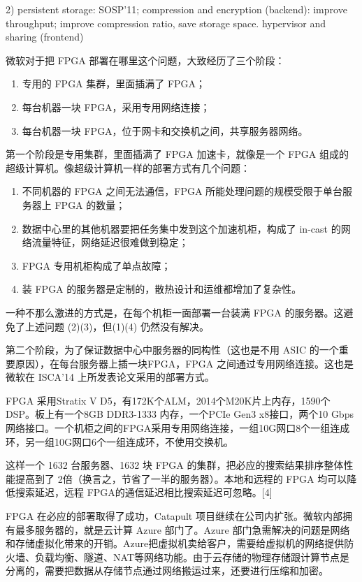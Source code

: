 2) persistent storage: SOSP'11; compression and encryption (backend): improve throughput; improve compression ratio, save storage space.
hypervisor and sharing (frontend)



微软对于把 FPGA 部署在哪里这个问题，大致经历了三个阶段：
\begin{enumerate}
	\item 专用的 FPGA 集群，里面插满了 FPGA；
	\item 每台机器一块 FPGA，采用专用网络连接；
	\item 每台机器一块 FPGA，位于网卡和交换机之间，共享服务器网络。
\end{enumerate}

第一个阶段是专用集群，里面插满了 FPGA 加速卡，就像是一个 FPGA 组成的超级计算机。像超级计算机一样的部署方式有几个问题：

\begin{enumerate}
	\item 不同机器的 FPGA 之间无法通信，FPGA 所能处理问题的规模受限于单台服务器上 FPGA 的数量；
	\item 数据中心里的其他机器要把任务集中发到这个加速机柜，构成了 in-cast 的网络流量特征，网络延迟很难做到稳定；
	\item FPGA 专用机柜构成了单点故障；
	\item 装 FPGA 的服务器是定制的，散热设计和运维都增加了复杂性。
\end{enumerate}

一种不那么激进的方式是，在每个机柜一面部署一台装满 FPGA 的服务器。这避免了上述问题 (2)(3)，但(1)(4) 仍然没有解决。

第二个阶段，为了保证数据中心中服务器的同构性（这也是不用 ASIC 的一个重要原因），在每台服务器上插一块FPGA，FPGA 之间通过专用网络连接。这也是微软在 ISCA’14 上所发表论文采用的部署方式。

FPGA 采用Stratix V D5，有172K个ALM，2014个M20K片上内存，1590个 DSP。板上有一个8GB DDR3-1333 内存，一个PCIe Gen3 x8接口，两个10 Gbps网络接口。一个机柜之间的FPGA采用专用网络连接，一组10G网口8个一组连成环，另一组10G网口6个一组连成环，不使用交换机。

这样一个 1632 台服务器、1632 块 FPGA 的集群，把必应的搜索结果排序整体性能提高到了 2倍（换言之，节省了一半的服务器）。本地和远程的 FPGA 均可以降低搜索延迟，远程 FPGA的通信延迟相比搜索延迟可忽略。[4]

FPGA 在必应的部署取得了成功，Catapult 项目继续在公司内扩张。微软内部拥有最多服务器的，就是云计算 Azure 部门了。Azure 部门急需解决的问题是网络和存储虚拟化带来的开销。Azure把虚拟机卖给客户，需要给虚拟机的网络提供防火墙、负载均衡、隧道、NAT等网络功能。由于云存储的物理存储跟计算节点是分离的，需要把数据从存储节点通过网络搬运过来，还要进行压缩和加密。

